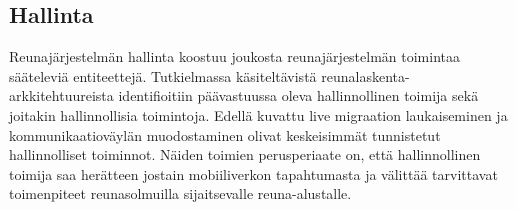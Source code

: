 \subsection{Hallinta}




Reunajärjestelmän hallinta koostuu joukosta reunajärjestelmän toimintaa sääteleviä entiteettejä. 
Tutkielmassa käsiteltävistä reunalaskenta\hyp arkkitehtuureista identifioitiin päävastuussa oleva hallinnollinen toimija sekä joitakin hallinnollisia toimintoja.
Edellä kuvattu live migraation laukaiseminen ja kommunikaatioväylän muodostaminen olivat keskeisimmät tunnistetut hallinnolliset toiminnot.
Näiden toimien perusperiaate on, että hallinnollinen toimija saa herätteen jostain mobiiliverkon tapahtumasta ja välittää tarvittavat toimenpiteet reunasolmuilla sijaitsevalle reuna-alustalle. 



